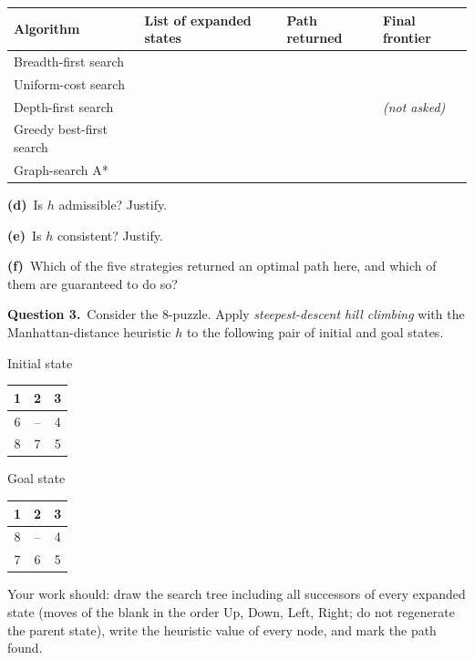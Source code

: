 \documentclass[11pt,a4paper]{article}
\newcommand{\question}[1]{\par\medskip\noindent\textbf{Question #1.}\ }
\newcommand{\subq}[1]{\par\smallskip\noindent\textbf{#1}\ }
\begin{document}
\begin{center}\small\begin{tabularx}{\linewidth}{|>{\raggedright}p{2.6cm}|>{\raggedright}X|>{\raggedright}p{3.6cm}|>{\raggedright\arraybackslash}p{2.6cm}|}\hline
\textbf{Algorithm} & \textbf{List of expanded states} & \textbf{Path returned} & \textbf{Final frontier}\\ \hline
Breadth-first search & & & \\[8mm] \hline
Uniform-cost search & & & \\[8mm] \hline
Depth-first search & & & \textit{(not asked)}\\[8mm] \hline
Greedy best-first search & & & \\[8mm] \hline
Graph-search A* & & & \\[8mm] \hline
\end{tabularx}\end{center}
\subq{(d)}Is $h$ admissible? Justify.
\begin{ansbox}[height=1.5cm]\end{ansbox}
\subq{(e)}Is $h$ consistent? Justify.
\begin{ansbox}[height=1.5cm]\end{ansbox}
\subq{(f)}Which of the five strategies returned an optimal path here, and which of them are guaranteed to do so?
\begin{ansbox}[height=1.5cm]\end{ansbox}
\clearpage
\question{3}Consider the 8-puzzle. Apply \emph{steepest-descent hill climbing} with the Manhattan-distance heuristic $h$ to the following pair of initial and goal states.\begin{center}Initial state\quad \begin{tabular}{|c|c|c|}\hline 1 & 2 & 3\\\hline 6 & -- & 4\\\hline 8 & 7 & 5\\\hline\end{tabular}\qquad\qquad Goal state\quad \begin{tabular}{|c|c|c|}\hline 1 & 2 & 3\\\hline 8 & -- & 4\\\hline 7 & 6 & 5\\\hline\end{tabular}\end{center}Your work should: draw the search tree including all successors of every expanded state (moves of the blank in the order Up, Down, Left, Right; do not regenerate the parent state), write the heuristic value of every node, and mark the path found.
\end{document}
